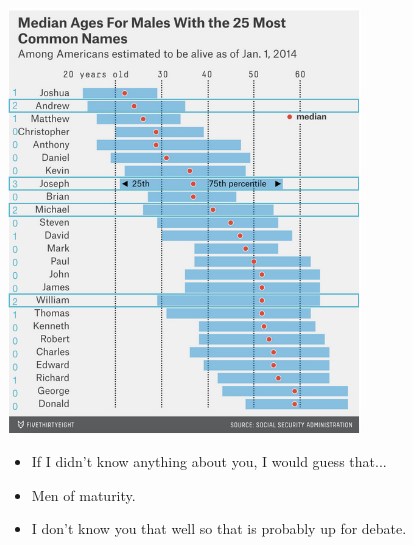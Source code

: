 \documentclass[slidestop,compress,mathserif,12pt,t,professionalfonts,xcolor=table]{beamer}
\begin{document}
\begin{frame}
\frametitle{}

\vspace{-0.45cm}

\begin{center}
\includegraphics[width=0.7\textwidth]{figures/popnamesclass538_male}
\end{center}

  \begin{itemize}
  \item If I didn't know anything about you, I would guess that...
  \item Men of maturity.  
  \item I don't know you that well so that is probably up for debate.
  \end{itemize}

\end{frame}

\end{document}
